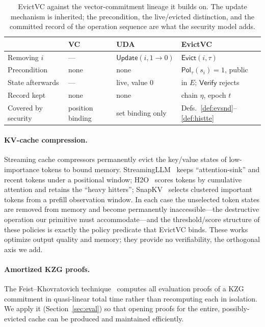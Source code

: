 \documentclass[version=submission]{iacrcc}
\theoremstyle{definition}
\newcommand{\Vfy}{\mathsf{Verify}}
\newcommand{\Evict}{\mathsf{Evict}}
\newcommand{\Pol}{\mathsf{Pol}}
\newcommand{\Evicted}{E}
\begin{document}
\begin{table}[t]\centering
\renewcommand{\arraystretch}{1.1}
\small
\begin{tabular}{@{}llll@{}}
\toprule
 & VC~\cite{PKC:CatFio13} & UDA~\cite[\S6.1]{PKC:CatFio13} & EvictVC \\
\midrule
Removing $i$        & ---              & $\mathsf{Update}(i,1\!\to\!0)$ & $\Evict(i,\tau)$ \\
Precondition        & none             & none              & $\Pol_\tau(s_i)=1$, public \\
State afterwards    & ---              & live, value $0$   & in $\Evicted$; $\Vfy$ rejects \\
Record kept         & none             & none              & chain $\eta$, epoch $t$ \\
Covered by security & position binding & set binding only  & Defs.~\ref{def:evsnd}--\ref{def:histte} \\
\bottomrule
\end{tabular}
\caption{EvictVC against the vector-commitment lineage it builds on. The update
mechanism is inherited; the precondition, the live/evicted distinction, and the
committed record of the operation sequence are what the security model adds.}
\label{tab:vccmp}
\end{table}

\paragraph{KV-cache compression.}
Streaming cache compressors permanently evict the key/value states of
low-importance tokens to bound memory. StreamingLLM~\cite{streamingllm} keeps
``attention-sink'' and recent tokens under a positional window; H2O~\cite{h2o}
scores tokens by cumulative attention and retains the ``heavy hitters'';
SnapKV~\cite{snapkv} selects clustered important tokens from a prefill
observation window. In each case the unselected token states are removed from
memory and become permanently inaccessible---the destructive operation our
primitive must accommodate---and the threshold/score structure of these policies
is exactly the policy predicate that EvictVC binds. These works optimize output
quality and memory; they provide no verifiability, the orthogonal axis we add.

\paragraph{Amortized KZG proofs.}
The Feist--Khovratovich technique~\cite{EPRINT:FeiKho23} computes all evaluation proofs of a
KZG commitment in quasi-linear total time rather than recomputing each in
isolation. We apply it (Section~\ref{sec:eval}) so that opening proofs for the
entire, possibly-evicted cache can be produced and maintained efficiently.
\end{document}
